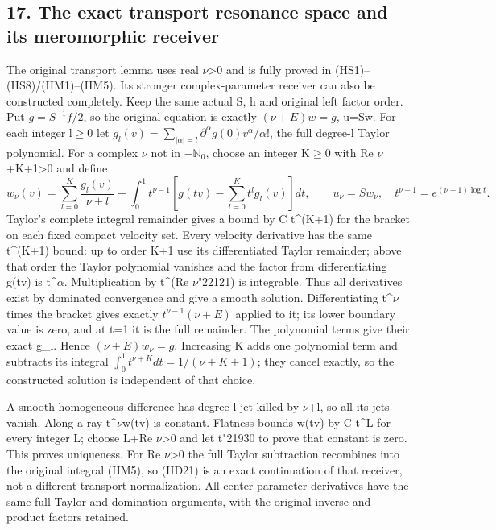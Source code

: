 \documentclass[
  11pt,
]{article}
\begin{document}
\subsection{17. The exact transport resonance space and its meromorphic
receiver}\label{the-exact-transport-resonance-space-and-its-meromorphic-receiver}

The original transport lemma uses real \ensuremath{\nu}\textgreater0 and is fully
proved in (HS1)--(HS8)/(HM1)--(HM5). Its stronger complex-parameter
receiver can also be constructed completely. Keep the same actual S, h
and original left factor order. Put \(g=S^{-1}f/2\), so the original
equation is exactly \((\nu+E)w=g\), u=Sw. For each integer l\ensuremath{\geq}0 let
\(g_l(v)=\sum_{|\alpha|=l}\partial^\alpha g(0)v^\alpha/\alpha!\), the
full degree-l Taylor polynomial. For a complex \ensuremath{\nu} not in
\(-\mathbb N_0\), choose an integer K\ensuremath{\geq}0 with Re \ensuremath{\nu}+K+1\textgreater0 and
define \[
w_\nu(v)=\sum_{l=0}^K\frac{g_l(v)}{\nu+l}
 +\int_0^1 t^{\nu-1}
        \left[g(tv)-\sum_{l=0}^Kt^lg_l(v)\right]dt,
\qquad u_\nu=Sw_\nu,
\quad t^{\nu-1}=e^{(\nu-1)\log t}.
\tag{HD21}
\] Taylor's complete integral remainder gives a bound by C t\^{}(K+1)
for the bracket on each fixed compact velocity set. Every velocity
derivative has the same t\^{}(K+1) bound: up to order K+1 use its
differentiated Taylor remainder; above that order the Taylor polynomial
vanishes and the factor from differentiating g(tv) is
t\^{}\textbar \ensuremath{\alpha}\textbar. Multiplication by t\^{}(Re \ensuremath{\nu}{\ReaderSymbols\char"2212}1) is integrable.
Thus all derivatives exist by dominated convergence and give a smooth
solution. Differentiating t\^{}\ensuremath{\nu} times the bracket gives exactly
\(t^{\nu-1}(\nu+E)\) applied to it; its lower boundary value is zero,
and at t=1 it is the full remainder. The polynomial terms give their
exact g\_l. Hence \((\nu+E)w_\nu=g\). Increasing K adds one polynomial
term and subtracts its integral \(\int_0^1t^{\nu+K}dt=1/(\nu+K+1)\);
they cancel exactly, so the constructed solution is independent of that
choice.

A smooth homogeneous difference has degree-l jet killed by \ensuremath{\nu}+l, so all
its jets vanish. Along a ray t\^{}\ensuremath{\nu}w(tv) is constant. Flatness bounds
w(tv) by C t\^{}L for every integer L; choose L+Re \ensuremath{\nu}\textgreater0 and
let t{\ReaderSymbols\char"2193}0 to prove that constant is zero. This proves uniqueness. For Re
\ensuremath{\nu}\textgreater0 the full Taylor subtraction recombines into the original
integral (HM5), so (HD21) is an exact continuation of that receiver, not
a different transport normalization. All center parameter derivatives
have the same full Taylor and domination arguments, with the original
inverse and product factors retained.
\end{document}
